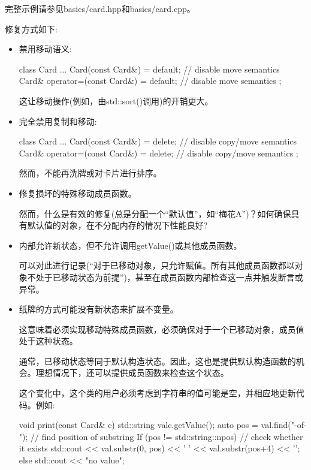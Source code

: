 完整示例请参见basics/card.hpp和basics/card.cpp。\par

修复方式如下:\par

\begin{itemize}
  \item 禁用移动语义:\par
\begin{codebox}[cpp]
  class Card {
    ...
    Card(const Card&) = default; // disable move semantics
    Card& operator=(const Card&) = default; // disable move semantics
  };
\end{codebox}
  这让移动操作(例如，由std::sort()调用)的开销更大。
  \item 完全禁用复制和移动:\par
\begin{codebox}[cpp]
  class Card {
    ...
    Card(const Card&) = delete; // disable copy/move semantics
    Card& operator=(const Card&) = delete; // disable copy/move semantics
  };
\end{codebox}
  然而，不能再洗牌或对卡片进行排序。
  \item 修复损坏的特殊移动成员函数。\par
  然而，什么是有效的修复(总是分配一个“默认值”，如“梅花A”)？如何确保具有默认值的对象，在不分配内存的情况下性能良好?
  \item 内部允许新状态，但不允许调用getValue()或其他成员函数。\par
  可以对此进行记录(“对于已移动对象，只允许赋值。所有其他成员函数都以对象不处于已移动状态为前提”)，甚至在成员函数内部检查这一点并触发断言或异常。
  \item 纸牌的方式可能没有新状态来扩展不变量。\par
  这意味着必须实现移动特殊成员函数，必须确保对于一个已移动对象，成员值处于这种状态。\par
  通常，已移动状态等同于默认构造状态。因此，这也是提供默认构造函数的机会。理想情况下，还可以提供成员函数来检查这个状态。\par
  这个变化中，这个类的用户必须考虑到字符串的值可能是空，并相应地更新代码。例如:\par
\begin{codebox}[cpp]
  void print(const Card& c) {
    std::string val{c.getValue()};
    auto pos = val.find("-of-"); // find position of substring
    If (pos != std::string::npos) { // check whether it exists
      std::cout << val.substr(0, pos) << ' '
      << val.substr(pos+4) << '\n';
    }
    else {
      std::cout << "no value\n";
    }
  }
\end{codebox}
\end{itemize}

